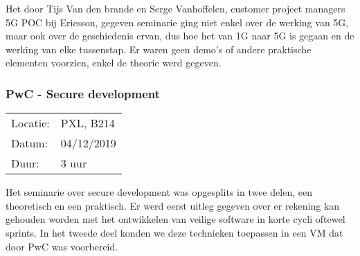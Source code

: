 Het door Tijs Van den brande en Serge Vanhoffelen, customer project managers 5G POC bij Ericsson, gegeven seminarie ging niet enkel over de werking van 5G, maar ook over de geschiedenis ervan, dus hoe het van 1G naar 5G is gegaan en de werking van elke tussenstap. Er waren geen demo's of andere praktische elementen voorzien, enkel de theorie werd gegeven.

\subsubsection{PwC - Secure development}

\begin{tabular}{l l}
  Locatie: & PXL, B214\\
  Datum: & 04/12/2019\\
  Duur: & 3 uur
\end{tabular}

Het seminarie over secure development was opgesplits in twee delen, een theoretisch en een praktisch. Er werd eerst uitleg gegeven over er rekening kan gehouden worden met het ontwikkelen van veilige software in korte cycli oftewel sprints. In het tweede deel konden we deze technieken toepassen in een VM dat door PwC was voorbereid.